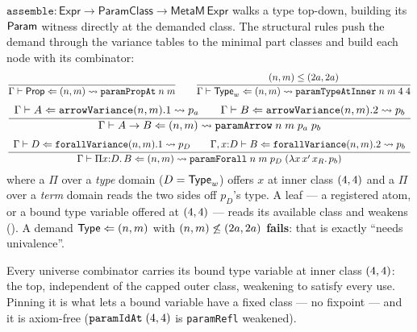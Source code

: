 \begin{definition}
  \label{def:assemble}
  \leanok
  $\texttt{assemble} : \mathsf{Expr} \to \mathsf{ParamClass} \to \mathsf{MetaM}\,\mathsf{Expr}$
  walks a type top-down, building its $\mathsf{Param}$ witness directly at the demanded
  class. The structural rules push the demand through the variance tables to the
  minimal part classes and build each node with its combinator:
  \[
    \dfrac{\begin{array}{c} \end{array}}{ \Gamma \vdash \mathsf{Prop} \Leftarrow (n,m) \rightsquigarrow \texttt{paramPropAt}\;n\;m }
    \qquad
    \dfrac{\begin{array}{c} (n,m) \leq (2a,2a) \end{array}}{ \Gamma \vdash \mathsf{Type}_w \Leftarrow (n,m) \rightsquigarrow \texttt{paramTypeAtInner}\;n\;m\;4\;4 }
  \]
  \[
    \dfrac{\begin{array}{c} \Gamma \vdash A \Leftarrow \texttt{arrowVariance}(n,m).1 \rightsquigarrow p_a \qquad
            \Gamma \vdash B \Leftarrow \texttt{arrowVariance}(n,m).2 \rightsquigarrow p_b \end{array}}{ \Gamma \vdash A \to B \Leftarrow (n,m) \rightsquigarrow \texttt{paramArrow}\;n\;m\;p_a\;p_b }
  \]
  \[
    \dfrac{\begin{array}{c} \Gamma \vdash D \Leftarrow \texttt{forallVariance}(n,m).1 \rightsquigarrow p_D \qquad
            \Gamma, x{:}D \vdash B \Leftarrow \texttt{forallVariance}(n,m).2 \rightsquigarrow p_b \end{array}}{ \Gamma \vdash \Pi x{:}D.\,B \Leftarrow (n,m) \rightsquigarrow \texttt{paramForall}\;n\;m\;p_D\;(\lambda x\,x'\,x_R.\,p_b) }
  \]
  where a $\Pi$ over a \emph{type} domain ($D = \mathsf{Type}_w$) offers $x$ at inner
  class $(4,4)$ and a $\Pi$ over a \emph{term} domain reads the two sides
  off $p_D$'s type. A leaf --- a registered atom, or a bound type variable
  offered at $(4,4)$ --- reads its available class and weakens
  (). A demand $\mathsf{Type} \Leftarrow (n,m)$ with
  $(n,m) \not\leq (2a,2a)$ \textbf{fails}: that is exactly ``needs
  univalence''.
\end{definition}

\begin{definition}
  \label{def:inner-class}
  \leanok
  Every universe combinator carries its bound type variable at inner class
  $(4,4)$: the top, independent of the capped outer class, weakening to
  satisfy every use. Pinning it is what lets a bound variable have a fixed class
  --- no fixpoint --- and it is axiom-free ($\texttt{paramIdAt}\;(4,4)$ is
  \texttt{paramRefl} weakened).
\end{definition}


